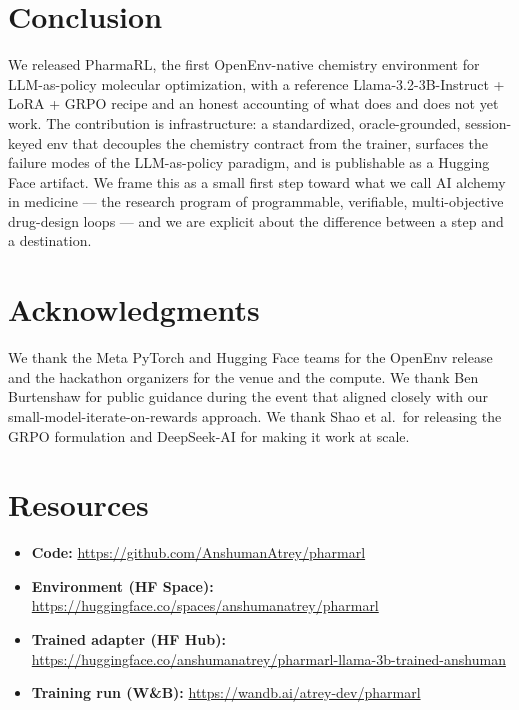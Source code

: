 \documentclass[11pt,a4paper]{article}
\newcommand{\wandbRunURL}{https://wandb.ai/atrey-dev/pharmarl}
\newcommand{\modelHFURL}{https://huggingface.co/anshumanatrey/pharmarl-llama-3b-trained-anshuman}
\newcommand{\envHFURL}{https://huggingface.co/spaces/anshumanatrey/pharmarl}
\newcommand{\codeURL}{https://github.com/AnshumanAtrey/pharmarl}
\begin{document}
\section{Conclusion}

We released PharmaRL, the first OpenEnv-native chemistry environment for LLM-as-policy molecular optimization, with a reference Llama-3.2-3B-Instruct + LoRA + GRPO recipe and an honest accounting of what does and does not yet work. The contribution is infrastructure: a standardized, oracle-grounded, session-keyed env that decouples the chemistry contract from the trainer, surfaces the failure modes of the LLM-as-policy paradigm, and is publishable as a Hugging Face artifact. We frame this as a small first step toward what we call AI alchemy in medicine --- the research program of programmable, verifiable, multi-objective drug-design loops --- and we are explicit about the difference between a step and a destination.

\section*{Acknowledgments}

We thank the Meta PyTorch and Hugging Face teams for the OpenEnv release and the hackathon organizers for the venue and the compute. We thank Ben Burtenshaw for public guidance during the event that aligned closely with our small-model-iterate-on-rewards approach. We thank Shao et al.\ for releasing the GRPO formulation and DeepSeek-AI for making it work at scale.

\section*{Resources}

\begin{itemize}[leftmargin=*,nosep]
  \item \textbf{Code:} \url{\codeURL}
  \item \textbf{Environment (HF Space):} \url{\envHFURL}
  \item \textbf{Trained adapter (HF Hub):} \url{\modelHFURL}
  \item \textbf{Training run (W\&B):} \url{\wandbRunURL}
\end{itemize}

\printbibliography
\end{document}
